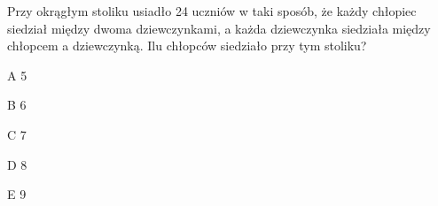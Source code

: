 \begin{tresc}
Przy okrągłym stoliku usiadło 24 uczniów w taki sposób, że każdy chłopiec siedział między dwoma dziewczynkami, a każda dziewczynka siedziała między chłopcem a dziewczynką. Ilu chłopców siedziało przy tym stoliku?
\end{tresc}
\begin{wariant}{A} 5 \end{wariant}
\begin{wariant}{B} 6 \end{wariant}
\begin{wariant}{C} 7 \end{wariant}
\begin{wariant}{D} 8 \end{wariant}
\begin{wariant}{E} 9 \end{wariant}
